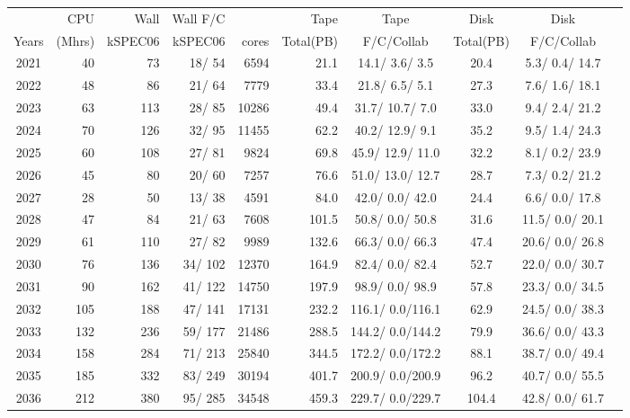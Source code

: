 \documentclass[12pt]{article}
\begin{document}
\begin{table}
\footnotesize
 \centering \begin{tabular}[h]{crrrrrcccc}
 & CPU &Wall&Wall F/C&\qquad  & Tape\qquad& Tape\qquad  & Disk\qquad  & Disk\qquad \\
Years&(Mhrs)&kSPEC06&kSPEC06&cores& Total(PB)&F/C/Collab & Total(PB) &F/C/Collab\\
\hline
2021&	  40&	  73&	  18/  54&	  6594&	     21.1&	  14.1/  3.6/  3.5&	     20.4&	   5.3/  0.4/ 14.7\\
2022&	  48&	  86&	  21/  64&	  7779&	     33.4&	  21.8/  6.5/  5.1&	     27.3&	   7.6/  1.6/ 18.1\\
2023&	  63&	 113&	  28/  85&	 10286&	     49.4&	  31.7/ 10.7/  7.0&	     33.0&	   9.4/  2.4/ 21.2\\
2024&	  70&	 126&	  32/  95&	 11455&	     62.2&	  40.2/ 12.9/  9.1&	     35.2&	   9.5/  1.4/ 24.3\\
2025&	  60&	 108&	  27/  81&	  9824&	     69.8&	  45.9/ 12.9/ 11.0&	     32.2&	   8.1/  0.2/ 23.9\\
2026&	  45&	  80&	  20/  60&	  7257&	     76.6&	  51.0/ 13.0/ 12.7&	     28.7&	   7.3/  0.2/ 21.2\\
2027&	  28&	  50&	  13/  38&	  4591&	     84.0&	  42.0/  0.0/ 42.0&	     24.4&	   6.6/  0.0/ 17.8\\
2028&	  47&	  84&	  21/  63&	  7608&	    101.5&	  50.8/  0.0/ 50.8&	     31.6&	  11.5/  0.0/ 20.1\\
2029&	  61&	 110&	  27/  82&	  9989&	    132.6&	  66.3/  0.0/ 66.3&	     47.4&	  20.6/  0.0/ 26.8\\
2030&	  76&	 136&	  34/ 102&	 12370&	    164.9&	  82.4/  0.0/ 82.4&	     52.7&	  22.0/  0.0/ 30.7\\
2031&	  90&	 162&	  41/ 122&	 14750&	    197.9&	  98.9/  0.0/ 98.9&	     57.8&	  23.3/  0.0/ 34.5\\
2032&	 105&	 188&	  47/ 141&	 17131&	    232.2&	 116.1/  0.0/116.1&	     62.9&	  24.5/  0.0/ 38.3\\
2033&	 132&	 236&	  59/ 177&	 21486&	    288.5&	 144.2/  0.0/144.2&	     79.9&	  36.6/  0.0/ 43.3\\
2034&	 158&	 284&	  71/ 213&	 25840&	    344.5&	 172.2/  0.0/172.2&	     88.1&	  38.7/  0.0/ 49.4\\
2035&	 185&	 332&	  83/ 249&	 30194&	    401.7&	 200.9/  0.0/200.9&	     96.2&	  40.7/  0.0/ 55.5\\
2036&	 212&	 380&	  95/ 285&	 34548&	    459.3&	 229.7/  0.0/229.7&	    104.4&	  42.8/  0.0/ 61.7\\

\end{tabular}
\end{table}
\end{document}
